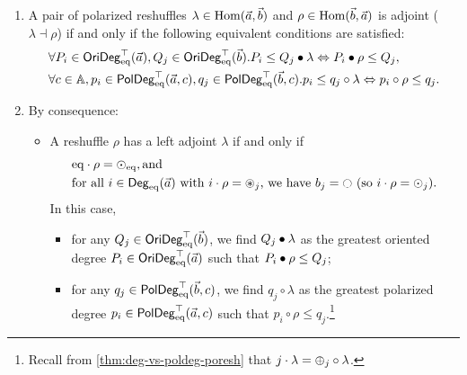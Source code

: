 \documentclass[a4paper]{memoir}
\begin{document}
\begin{theorem}\label{thm:poresh-adjoint}
	\begin{enumerate}
		\item A pair of polarized reshuffles $\lambda \in {\mathrm{Hom}}(\vec a, \vec b)$ and $\rho \in {\mathrm{Hom}}(\vec b, \vec a)$ is adjoint ($\lambda \dashv \rho$) if and only if the following equivalent conditions are satisfied:
		\begin{align}
			&\forall P_i \in \mathsf{OriDeg}_{\mathrm{eq}}^\top(\vec a), Q_j \in \mathsf{OriDeg}_{\mathrm{eq}}^\top(\vec b). P_i \leq Q_j \mathbin{\bullet} \lambda \Leftrightarrow P_i \mathbin{\bullet} \rho \leq Q_j,
			\label{eq:poresh-adjoint-crit-orideg}
			\\
			&\forall c \in {\mathbb{A}}, p_i \in \mathsf{PolDeg}_{\mathrm{eq}}^\top(\vec a, c), q_j \in \mathsf{PolDeg}_{\mathrm{eq}}^\top(\vec b, c). p_i \leq q_j \circ \lambda \Leftrightarrow p_i \circ \rho \leq q_j.
			\label{eq:poresh-adjoint-crit-poldeg}
		\end{align}
		\item By consequence:
		\begin{itemize}
			\item A reshuffle $\rho$ has a left adjoint $\lambda$ if and only if
			\begin{align}
				&\eqtydeg \cdot \rho = \nonpol_\eqtydeg, \text{and} \label{eq:poresh-left-adjoint-crit1} \\
				&\text{for all } i \in \Degeq(\vec a) \text{ with } i \cdot \rho = \isopol_j \text{, we have } b_j = \npolar \text{ (so $i \cdot \rho = \nonpol_j$)}. \label{eq:poresh-left-adjoint-crit2}
			\end{align}
			In this case,
			\begin{itemize}
				\item for any $Q_j \in \mathsf{OriDeg}_{\mathrm{eq}}^\top(\vec b)$, we find $Q_j \mathbin{\bullet} \lambda$ as the greatest oriented degree $P_i \in \mathsf{OriDeg}_{\mathrm{eq}}^\top(\vec a)$ such that $P_i \mathbin{\bullet} \rho \leq Q_j$;
				\item for any $q_j \in \mathsf{PolDeg}_{\mathrm{eq}}^\top(\vec b, c)$, we find $q_j \circ \lambda$ as the greatest polarized degree $p_i \in \mathsf{PolDeg}_{\mathrm{eq}}^\top(\vec a, c)$ such that $p_i \circ \rho \leq q_j$.\footnote{Recall from \cref{thm:deg-vs-poldeg-poresh} that $j \cdot \lambda = {\oplus}_j \circ \lambda$.}
			\end{itemize}
			

\end{itemize}
\end{enumerate}
\end{theorem}
\end{document}
